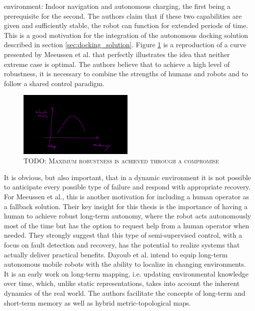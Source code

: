 \documentclass[english, master, utf8]{base/thesis_KBS}
\begin{document}
environment: Indoor navigation and autonomous charging, the first being a prerequisite for the second. The authors claim that if these two capabilities are given and sufficiently
stable, the robot can function for extended periods of time. This is a good motivation for the integration of the autonomous docking solution described in section
\ref{sec:docking_solution}. Figure \ref{fig:autonomy_robustness} is a reproduction of a curve presented by Meeussen et al. \cite{Meeussen:2011} that perfectly illustrates the idea that
neither extreme case is optimal. The authors believe that to achieve a high level of robustness, it is necessary to combine the strengths of humans and robots and to follow a shared
control paradigm.
\begin{figure}[H]
    \centering
    \includegraphics[width=0.5\textwidth]{pics/autonomy_robustness.png}
    \caption{\textsc{TODO: Maximum robustness is achieved through a compromise}}
    \label{fig:autonomy_robustness}
\end{figure}
It is obvious, but also important, that in a dynamic environment it is not possible to anticipate every possible type of failure and respond with appropriate recovery.
\cite{Meeussen:2011} For Meeussen et al., this is another motivation for including a human operator as a fallback solution. Their key insight for this thesis is the importance of having
a human  to achieve robust long-term autonomy, where the robot acts autonomously most of the time but has the option to request help from a human operator
when needed. They strongly suggest that this type of semi-supervised control, with a focus on fault detection and recovery, has the potential to realize systems that actually deliver
practical benefits.\newline
Dayoub et al. \cite{Dayoub:2011} intend to equip long-term autonomous mobile robots with the ability to localize in changing environments. It is an early work on long-term mapping,
i.e. updating environmental knowledge over time, which, unlike static representations, takes into account the inherent dynamics of the real world. The authors facilitate the concepts
of long-term and short-term memory as well as hybrid metric-topological maps.\newline
\end{document}
